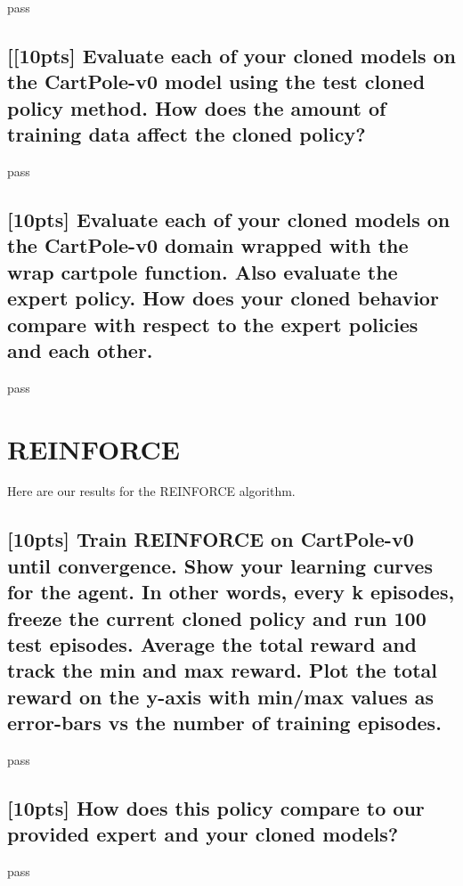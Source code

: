 \documentclass{article}
\begin{document}
pass

\subsection{[[10pts] Evaluate each of your cloned models on the CartPole-v0 model using the test cloned policy method. How does the amount of training data affect the cloned policy?}

pass

\subsection{[10pts] Evaluate each of your cloned models on the CartPole-v0 domain wrapped with the wrap cartpole function. Also evaluate the expert policy. How does your cloned behavior compare with respect to the expert policies and each other.}

pass



\section{REINFORCE}
Here are our results for the REINFORCE algorithm. 

\subsection{[10pts] Train REINFORCE on CartPole-v0 until convergence. Show your learning curves for the agent. In other words, every k episodes, freeze the current cloned policy and run 100 test episodes. Average the total reward and track the min and max reward. Plot the total reward on the y-axis with min/max values as error-bars vs the number of training episodes.}

pass

\subsection{[10pts] How does this policy compare to our provided expert and your cloned models?}

pass



\small
\medskip


\end{document}
